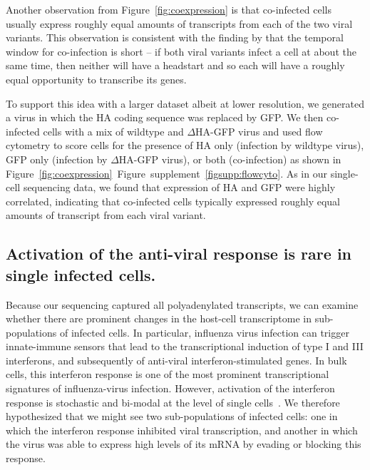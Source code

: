\documentclass[9pt,lineno]{elife}
\begin{document}
Another observation from Figure~\ref{fig:coexpression} is that co-infected cells usually express roughly equal amounts of transcripts from each of the two viral variants.
This observation is consistent with the finding by \citet{dou2017analysis} that the temporal window for co-infection is short -- if both viral variants infect a cell at about the same time, then neither will have a headstart and so each will have a roughly equal opportunity to transcribe its genes.

To support this idea with a larger dataset albeit at lower resolution, we generated a virus in which the HA coding sequence was replaced by GFP.
We then co-infected cells with a mix of wildtype and $\Delta$HA-GFP virus and used flow cytometry to score cells for the presence of HA only (infection by wildtype virus), GFP only (infection by $\Delta$HA-GFP virus), or both (co-infection) as shown in Figure~\ref{fig:coexpression}~Figure~supplement~\ref{figsupp:flowcyto}.
As in our single-cell sequencing data, we found that expression of HA and GFP were highly correlated, indicating that co-infected cells typically expressed roughly equal amounts of transcript from each viral variant.

\subsection{Activation of the anti-viral response is rare in single infected cells.}
Because our sequencing captured all polyadenylated transcripts, we can examine whether there are prominent changes in the host-cell transcriptome in sub-populations of infected cells.
In particular, influenza virus infection can trigger innate-immune sensors that lead to the transcriptional induction of type I and III interferons, and subsequently of anti-viral interferon-stimulated genes.
In bulk cells, this interferon response is one of the most prominent transcriptional signatures of influenza-virus infection.
However, activation of the interferon response is stochastic and bi-modal at the level of single cells~\citep{shalek2013single,shalek2014single,bhushal2017cell}.
We therefore hypothesized that we might see two sub-populations of infected cells: one in which the interferon response inhibited viral transcription, and another in which the virus was able to express high levels of its mRNA by evading or blocking this response.
\end{document}
